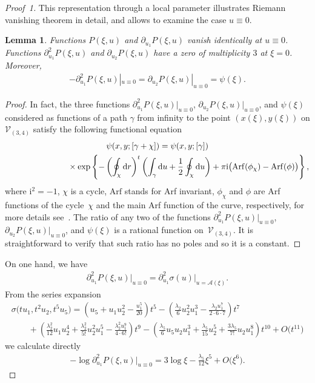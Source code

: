 \documentclass[pdftex]{sigma}
\numberwithin{equation}{section}
\newtheorem{Lemma}[Theorem]{Lemma}
\newcommand{\rmd}{\mathrm{d}}
\newcommand{\rmi}{\mathrm{i}}
\newcommand{\Arf}{\mathrm{Arf}}
\begin{document}
\begin{proof}[Proof~1]
This representation through a local parameter illustrates Riemann vanishing theorem in detail, and allows to examine the case $u\equiv 0$.
\begin{Lemma}\label{L:PsiC34}
Functions $P(\xi,u)$ and $\partial_{u_1} P(\xi,u)$ vanish identically at $u\equiv 0$. Functions $\partial^2_{u_1} P(\xi,u)$ and $\partial_{u_2} P(\xi,u)$ have a zero of multiplicity $3$ at $\xi=0$. Moreover,
\begin{gather*}
 -\partial^2_{u_1} P(\xi,u)|_{u\equiv 0} = \partial_{u_2} P(\xi,u)|_{u\equiv 0} = \psi(\xi).
\end{gather*}
\end{Lemma}
\begin{proof} In fact, the three functions $\partial^2_{u_1} P(\xi,u)|_{u\equiv 0}$, $\partial_{u_2} P(\xi,u)|_{u\equiv 0}$, and $\psi(\xi)$ considered as functions of a path $\gamma$ from infinity to the point $(x(\xi),y(\xi))$ on $\mathcal{V}_{(3,4)}$ satisfy the following functional equation
\begin{gather}
 \psi(x,y;[\gamma + \chi]) = \psi(x,y;[\gamma]) \nonumber\\
 \hphantom{\psi(x,y;[\gamma + \chi]) =}{}\times \exp \left\{ - \left(\oint_{\chi} \rmd r \right)^t
 \left(\int_{\gamma} \rmd u + \frac{1}{2}\oint_{\chi} \rmd u\right) + \pi \rmi \big(\Arf(\phi_\chi) - \Arf(\phi) \big)\right\},\label{PsiFEq}
\end{gather}
where $\rmi^2=-1$, $\chi$ is a cycle, $\Arf$ stands for Arf invariant, $\phi_\chi$ and $\phi$ are Arf functions of the cycle~$\chi$ and the main Arf function of the curve, respectively, for more details see~\cite{BL2005}. The ratio of any two of the functions $\partial^2_{u_1} P(\xi,u)|_{u\equiv 0}$, $\partial_{u_2} P(\xi,u)|_{u\equiv 0}$, and $\psi(\xi)$ is a rational function on~$\mathcal{V}_{(3,4)}$. It is straightforward to verify that such ratio has no poles and so it is a constant.
\end{proof}

On one hand, we have
\begin{gather*}
 \partial^2_{u_1} P(\xi,u) \big|_{u\equiv 0} = \partial^2_{u_1} \sigma (u) \big|_{u = \mathcal{A}(\xi)}.
\end{gather*}
From the series expansion
\begin{gather}
 \sigma\big(t u_1,t^2 u_2,t^5 u_5\big) = \left(u_5 + u_1 u_2^2 - \frac{u_1^5}{20} \right)t^5 -
 \left(\frac{\lambda_2}{6} u_2^2 u_1^3 - \frac{\lambda_2 u_1^7}{2\cdot 6\cdot 7}\right)t^7 \label{C34Sigma}\\
 \qquad{} + \left(\frac{\lambda_2^2}{12} u_1 u_2^4 + \frac{\lambda_2^2}{5!} u_2^2 u_1^5
 - \frac{\lambda_2^2 u_1^9}{4\cdot 6!} \right) t^9
 - \left(\frac{\lambda_5}{6} u_5 u_2 u_1^3 + \frac{\lambda_5}{15} u_2^5 +
 \frac{3\lambda_5}{7!}u_2 u_1^8 \right)t^{10} + O\big(t^{11}\big)\nonumber
\end{gather}
we calculate directly
\begin{gather}\label{C34Psisigma}
 -\log \partial^2_{u_1} P(\xi,u) \big|_{u\equiv 0} = 3\log \xi - \frac{\lambda_5}{12} \xi^5 + O\big(\xi^6\big).
\end{gather}


\end{proof}
\end{document}
